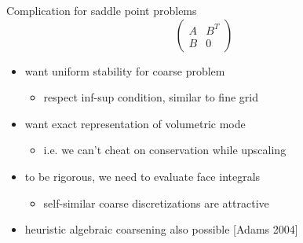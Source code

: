 \documentclass{beamer}
\begin{document}
\begin{frame}{Complication for saddle point problems}
  \[ \begin{pmatrix}
    A & B^T \\ B & 0
  \end{pmatrix} \]
  \begin{itemize}
  \item want uniform stability for coarse problem
    \begin{itemize}
    \item respect inf-sup condition, similar to fine grid
    \end{itemize}
  \item want exact representation of volumetric mode
    \begin{itemize}
    \item i.e. we can't cheat on conservation while upscaling
    \end{itemize}
  \item to be rigorous, we need to evaluate face integrals
    \begin{itemize}
    \item self-similar coarse discretizations are attractive
    \end{itemize}
  \item heuristic algebraic coarsening also possible [Adams 2004]
  \end{itemize}
\end{frame}
\end{document}
